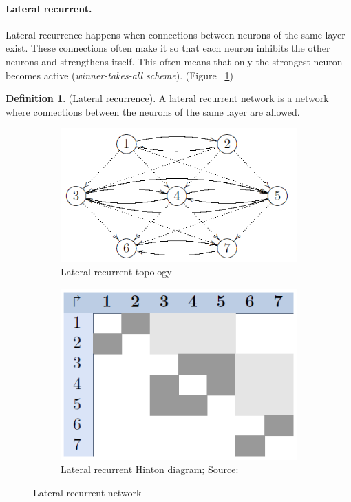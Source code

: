 \documentclass[pdftex,a4paper,12pt,twoside]{report}
\theoremstyle{plain} \newtheorem{theorem}{Theorem} \newtheorem{proposition}{Proposition} \newtheorem{lemma}{Lemma} \newtheorem*{corollary}{Corollary}
\theoremstyle{definition} \newtheorem{definition}{Definition} \newtheorem{conjecture}{Conjecture} \newtheorem*{example}{Example} \newtheorem{algorithm}{Algorithm}
\theoremstyle{remark} \newtheorem*{remark}{Remark} \newtheorem*{note}{Note} \newtheorem{case}{Case}
\begin{document}
\paragraph{Lateral recurrent.}
Lateral recurrence happens when connections between neurons of the same layer exist. These connections often make it so that each neuron inhibits the other neurons and strengthens itself. This often means that only the strongest neuron becomes active (\emph{winner-takes-all scheme}). (Figure ~\ref{fig:lateralrecurrence})
\begin{definition}
(Lateral recurrence). A lateral recurrent network is a network where connections between the neurons of the same layer are allowed.
\end{definition}
\begin{figure}
\centering
	\begin{subfigure}[b]{0.49\textwidth}
	\centering
	\includegraphics[width=\textwidth]{./img/recurrent-lateral-Topology.png}
	\caption{Lateral recurrent topology}
	\end{subfigure}
	\begin{subfigure}[b]{0.49\textwidth}
	\centering
	\includegraphics[width=\textwidth]{./img/recurrent-lateral-Hinton.png}
	\caption{Lateral recurrent Hinton diagram; Source:\citep{Kriesel2013}}
	\end{subfigure}
\caption{Lateral recurrent network}
\label{fig:lateralrecurrence}
\end{figure}
\end{document}
